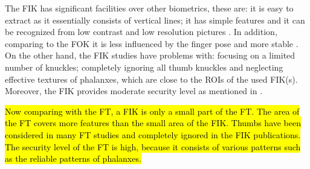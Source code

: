 \documentclass[review]{elsarticle}
\begin{document}
	The FIK has significant facilities over other biometrics, these are: it is easy to extract as it essentially consists of vertical lines; it has simple features and it can be recognized from low contrast and low resolution pictures \cite{li2004personal}. In addition, comparing to the FOK it is less influenced by the finger pose and more stable \cite{Le-qing2010multimodal}. On the other hand, the FIK studies have problems with: focusing on a limited number of knuckles; completely ignoring all thumb knuckles and neglecting effective textures of phalanxes, which are close to the ROIs of the used FIK(s). Moreover, the FIK provides moderate security level as mentioned in \cite{jaswal2016knuckle}.
	
	\hl{Now comparing with the FT, a FIK is only a small part of the FT. The area of the FT covers more features than the small area of the FIK. Thumbs have been considered in many FT studies and completely ignored in the FIK publications. The security level of the FT is high, because it consists of various patterns such as the reliable patterns of phalanxes. }
\end{document}
